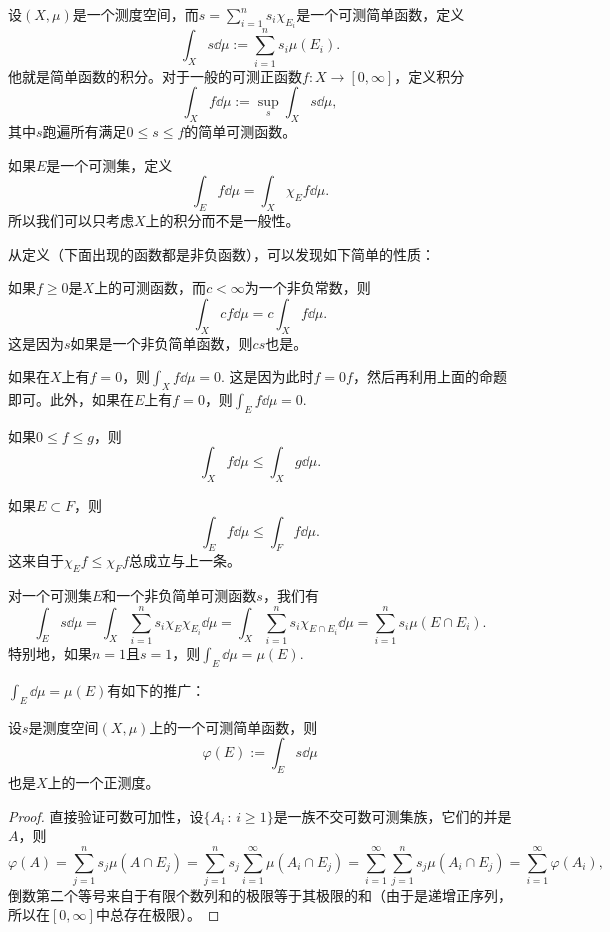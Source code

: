 \begin{para}
设$(X,\mu)$是一个测度空间，而$s=\sum_{i=1}^n s_i \chi_{E_i}$是一个可测简单函数，定义
\[
	\int_X s \dd \mu:=\sum_{i=1}^n s_i \mu(E_i).
\]
他就是简单函数的积分。对于一般的可测正函数$f:X\to [0,\infty]$，定义积分
\[
	\int_X f\dd \mu:=\sup_s \int_X s\dd \mu,
\]
其中$s$跑遍所有满足$0\leq s \leq f$的简单可测函数。

如果$E$是一个可测集，定义
\[
	\int_E f\dd \mu =\int_X \chi_E f\dd \mu.
\]
所以我们可以只考虑$X$上的积分而不是一般性。
\end{para}

从定义（下面出现的函数都是非负函数），可以发现如下简单的性质：
\begin{compactenum}[(1)]
\item 如果$f\geq 0$是$X$上的可测函数，而$c<\infty$为一个非负常数，则
\[
	\int_X cf\dd \mu=c\int_X f\dd \mu.
\]
这是因为$s$如果是一个非负简单函数，则$cs$也是。
\item 如果在$X$上有$f=0$，则$\int_X f\dd \mu=0$. 这是因为此时$f=0f$，然后再利用上面的命题即可。此外，如果在$E$上有$f=0$，则$\int_E f\dd \mu=0$.
\item 如果$0\leq f\leq g$，则
\[
	\int_X f\dd \mu\leq \int_X g \dd \mu.
\]
\item 如果$E\subset F$，则
\[
	\int_E f\dd \mu\leq \int_F f \dd \mu.
\]
这来自于$\chi_E f\leq \chi_F f$总成立与上一条。
\item 对一个可测集$E$和一个非负简单可测函数$s$，我们有
\[
	\int_E s\dd \mu =\int_X \sum_{i=1}^ns_i\chi_E  \chi_{E_i}\dd\mu=\int_X \sum_{i=1}^ns_i\chi_{E\cap E_i}\dd\mu=\sum_{i=1}^ns_i\mu(E\cap E_i).
\]
特别地，如果$n=1$且$s=1$，则$\int_E \dd \mu=\mu(E)$.
\end{compactenum}

$\int_E \dd \mu=\mu(E)$有如下的推广：
\begin{pro}
设$s$是测度空间$(X,\mu)$上的一个可测简单函数，则
\[
	\varphi(E):=\int_E s\dd\mu
\]
也是$X$上的一个正测度。
\end{pro}

\begin{proof}
直接验证可数可加性，设$\{A_i\,:\,i\geq 1\}$是一族不交可数可测集族，它们的并是$A$，则
\[
	\varphi(A)=\sum_{j=1}^ns_j\mu(A\cap E_j)=\sum_{j=1}^ns_j\sum_{i=1}^\infty \mu(A_i\cap E_j)=\sum_{i=1}^\infty \sum_{j=1}^ns_j \mu(A_i\cap E_j)=\sum_{i=1}^\infty\varphi(A_i),
\]
倒数第二个等号来自于有限个数列和的极限等于其极限的和（由于是递增正序列，所以在$[0,\infty]$中总存在极限）。
\end{proof}


